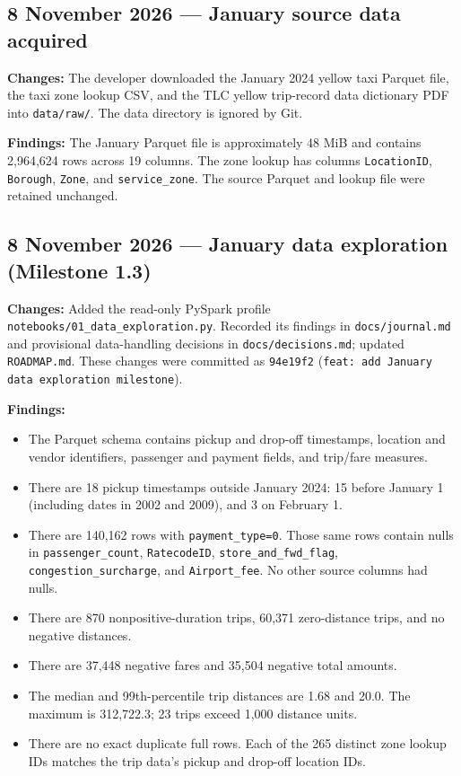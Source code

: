 \documentclass[11pt,a4paper]{article}
\begin{document}
\subsection{8 November 2026 --- January source data acquired}
\textbf{Changes:} The developer downloaded the January 2024 yellow taxi Parquet
file, the taxi zone lookup CSV, and the TLC yellow trip-record data dictionary
PDF into \texttt{data/raw/}. The data directory is ignored by Git.

\textbf{Findings:} The January Parquet file is approximately 48 MiB and contains
2,964,624 rows across 19 columns. The zone lookup has columns
\texttt{LocationID}, \texttt{Borough}, \texttt{Zone}, and
\texttt{service\_zone}. The source Parquet and lookup file were retained
unchanged.

\subsection{8 November 2026 --- January data exploration (Milestone 1.3)}
\textbf{Changes:} Added the read-only PySpark profile
\texttt{notebooks/01\_data\_exploration.py}. Recorded its findings in
\texttt{docs/journal.md} and provisional data-handling decisions in
\texttt{docs/decisions.md}; updated \texttt{ROADMAP.md}. These changes were
committed as \texttt{94e19f2}
(\texttt{feat: add January data exploration milestone}).

\textbf{Findings:}
\begin{itemize}
  \item The Parquet schema contains pickup and drop-off timestamps, location and
        vendor identifiers, passenger and payment fields, and trip/fare measures.
  \item There are 18 pickup timestamps outside January 2024: 15 before
        January 1 (including dates in 2002 and 2009), and 3 on February 1.
  \item There are 140,162 rows with \texttt{payment\_type=0}. Those same rows
        contain nulls in \texttt{passenger\_count}, \texttt{RatecodeID},
        \texttt{store\_and\_fwd\_flag}, \texttt{congestion\_surcharge}, and
        \texttt{Airport\_fee}. No other source columns had nulls.
  \item There are 870 nonpositive-duration trips, 60,371 zero-distance trips,
        and no negative distances.
  \item There are 37,448 negative fares and 35,504 negative total amounts.
  \item The median and 99th-percentile trip distances are 1.68 and 20.0. The
        maximum is 312,722.3; 23 trips exceed 1,000 distance units.
  \item There are no exact duplicate full rows. Each of the 265 distinct zone
        lookup IDs matches the trip data's pickup and drop-off location IDs.
\end{itemize}
\end{document}
